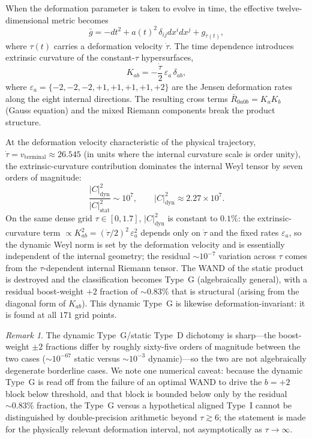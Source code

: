 \documentclass[12pt]{article}
\theoremstyle{definition}
\theoremstyle{remark}
\newtheorem{remark}[theorem]{Remark}
\begin{document}
When the deformation parameter is taken to evolve in time, the effective twelve-dimensional metric becomes
\begin{equation}
\label{eq:dynamic}
\bar{g} = -dt^2 + a(t)^2\,\delta_{ij}dx^i dx^j + g_{\tau(t)},
\end{equation}
where $\tau(t)$ carries a deformation velocity $\dot{\tau}$.  The time dependence introduces extrinsic curvature of the constant-$\tau$ hypersurfaces,
\begin{equation}
K_{ab} = -\frac{\dot{\tau}}{2}\,\varepsilon_a\,\delta_{ab},
\end{equation}
where $\varepsilon_a=\{-2,-2,-2,+1,+1,+1,+1,+2\}$ are the Jensen deformation rates along the eight internal directions.  The resulting cross terms $\bar{R}_{0a0b}=K_a K_b$ (Gauss equation) and the mixed Riemann components break the product structure.

At the deformation velocity characteristic of the physical trajectory, $\dot{\tau}=v_{\mathrm{terminal}}\approx26.545$ (in units where the internal curvature scale is order unity), the extrinsic-curvature contribution dominates the internal Weyl tensor by seven orders of magnitude:
\begin{equation}
\frac{|C|^2_{\mathrm{dyn}}}{|C|^2_{\mathrm{stat}}} \sim 10^7,
\qquad
|C|^2_{\mathrm{dyn}}\approx 2.27\times10^{7}.
\end{equation}
On the same dense grid $\tau\in[0,1.7]$, $|C|^2_{\mathrm{dyn}}$ is constant to $0.1\%$: the extrinsic-curvature term $\propto K_{ab}^2=(\dot{\tau}/2)^2\,\varepsilon_a^2$ depends only on $\dot{\tau}$ and the fixed rates $\varepsilon_a$, so the dynamic Weyl norm is set by the deformation velocity and is essentially independent of the internal geometry; the residual $\sim10^{-7}$ variation across $\tau$ comes from the $\tau$-dependent internal Riemann tensor.  The WAND of the static product is destroyed and the classification becomes Type~G (algebraically general), with a residual boost-weight $+2$ fraction of $\sim0.83\%$ that is structural (arising from the diagonal form of $K_{ab}$).  This dynamic Type~G is likewise deformation-invariant: it is found at all $171$ grid points.

\begin{remark}
The dynamic Type~G/static Type~D dichotomy is sharp---the boost-weight $\pm2$ fractions differ by roughly sixty-five orders of magnitude between the two cases ($\sim10^{-67}$ static versus $\sim10^{-3}$ dynamic)---so the two are not algebraically degenerate borderline cases.  We note one numerical caveat: because the dynamic Type~G is read off from the failure of an optimal WAND to drive the $b=+2$ block below threshold, and that block is bounded below only by the residual $\sim0.83\%$ fraction, the Type~G versus a hypothetical aligned Type~I cannot be distinguished by double-precision arithmetic beyond $\tau\gtrsim6$; the statement is made for the physically relevant deformation interval, not asymptotically as $\tau\to\infty$.
\end{remark}
\end{document}

